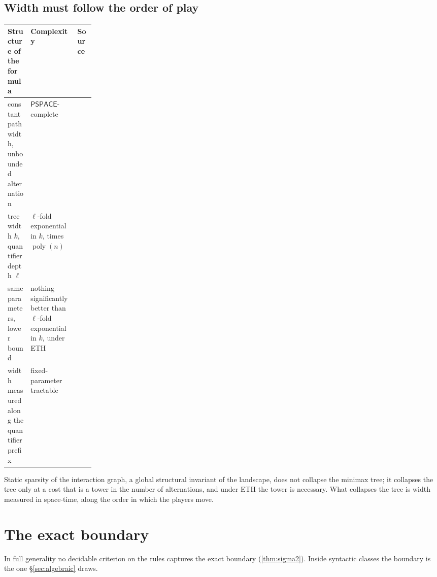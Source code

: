 \documentclass[final]{siamart0516}
\numberwithin{theorem}{section}
\numberwithin{equation}{section}
\theoremstyle{siamnonum}
\theoremstyle{plain}
\newcommand{\poly}{\operatorname{poly}}
\newcommand{\cls}[1]{\mathsf{#1}}
\newcommand{\PSPACE}{\cls{PSPACE}}
\begin{document}
\subsection{Width must follow the order of play}\label{ssec:width}
\begin{center}\small
\begin{tabularx}{\linewidth}{@{}>{\raggedright\arraybackslash}X>{\raggedright\arraybackslash}X>{\raggedright\arraybackslash}p{0.2\linewidth}@{}}
\toprule
Structure of the formula & Complexity & Source\\ \midrule
constant pathwidth, unbounded alternation & $\PSPACE$-complete & \cite{AtseriasOliva}\\
treewidth $k$, quantifier depth $\ell$ & $\ell$-fold exponential in $k$, times $\poly(n)$ & \cite{Chen04}\\
same parameters, lower bound & nothing significantly better than $\ell$-fold exponential in $k$, under ETH & \cite{FHP}\\
width measured along the quantifier prefix & fixed-parameter tractable & \cite{EGO,AtseriasOliva}\\
\bottomrule
\end{tabularx}
\end{center}
Static sparsity of the interaction graph, a global structural invariant of the landscape, does not collapse the minimax tree; it collapses the tree only at a cost that is a tower in the number of alternations, and under ETH the tower is necessary. What collapses the tree is width measured in space-time, along the order in which the players move.

\section{The exact boundary}\label{sec:boundary}

In full generality no decidable criterion on the rules captures the exact boundary (\cref{thm:sigma2}). Inside syntactic classes the boundary is the one \S\ref{sec:algebraic} draws.
\end{document}
